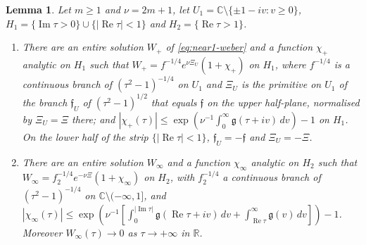 \documentclass[11pt]{amsart}
\newtheorem{lemma}[theorem]{Lemma}
\theoremstyle{definition}
\theoremstyle{remark}
\numberwithin{equation}{section}
\newcommand{\C}{\mathbb{C}}
\newcommand{\R}{\mathbb{R}}
\DeclareMathOperator{\re}{Re}
\DeclareMathOperator{\im}{Im}
\begin{document}
\begin{lemma}\label{lem:near1-LGsol}
Let $m\ge1$ and $\nu=2m+1$, let $U_1=\C\setminus\{\pm1-iv:v\ge0\}$, $H_1=\{\im\tau>0\}\cup\{|\re\tau|<1\}$ and $H_2=\{\re\tau>1\}$.
\begin{enumerate}
\item[(a)] There are an entire solution $W_+$ of \eqref{eq:near1-weber} and a function $\chi_+$ analytic on $H_1$ such that $W_+=f^{-1/4}e^{\nu\Xi_U}(1+\chi_+)$ on $H_1$, where $f^{-1/4}$ is a continuous branch of $(\tau^2-1)^{-1/4}$ on $U_1$ and $\Xi_U$ is the primitive on $U_1$ of the branch $\mathfrak f_U$ of $(\tau^2-1)^{1/2}$ that equals $\mathfrak f$ on the upper half-plane, normalised by $\Xi_U=\Xi$ there; and $|\chi_+(\tau)|\le\exp(\nu^{-1}\int_0^\infty\mathfrak g(\tau+iv)\,dv)-1$ on $H_1$. On the lower half of the strip $\{|\re\tau|<1\}$, $\mathfrak f_U=-\mathfrak f$ and $\Xi_U=-\Xi$.
\item[(b)] There are an entire solution $W_\infty$ and a function $\chi_\infty$ analytic on $H_2$ such that $W_\infty=f_2^{-1/4}e^{-\nu\Xi}(1+\chi_\infty)$ on $H_2$, with $f_2^{-1/4}$ a continuous branch of $(\tau^2-1)^{-1/4}$ on $\C\setminus(-\infty,1]$, and $|\chi_\infty(\tau)|\le\exp(\nu^{-1}[\int_0^{|\im\tau|}\mathfrak g(\re\tau+iv)\,dv+\int_{\re\tau}^\infty\mathfrak g(v)\,dv])-1$. Moreover $W_\infty(\tau)\to0$ as $\tau\to+\infty$ in $\R$.
\end{enumerate}
\end{lemma}
\end{document}
